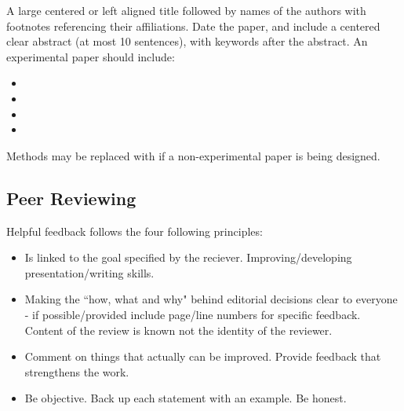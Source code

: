 \documentclass[12pt, a4paper, oneside, openright, titlepage]{book}
\begin{document}
\begin{appendices}
    A large centered or left aligned title followed by names of the authors with footnotes referencing their affiliations. Date the paper, and include a centered clear abstract (at most 10 sentences), with keywords after the abstract. An experimental paper should include:
    \begin{itemize}
        \item {}
        \item {}
        \item {}
        \item {}
    \end{itemize}

    Methods may be replaced with  if a non-experimental paper is being designed.



    \subsection{Peer Reviewing}

    Helpful feedback follows the four following principles: \begin{itemize}
        \item {} Is linked to the goal specified by the reciever. Improving/developing presentation/writing skills.
        \item {} Making the ``how, what and why" behind editorial decisions clear to everyone - if possible/provided include page/line numbers for specific feedback. Content of the review is known not the identity of the reviewer.
        \item {} Comment on things that actually can be improved. Provide feedback that strengthens the work.
        \item {} Be objective. Back up each statement with an example. Be honest.
    \end{itemize}




\end{appendices}
\end{document}
